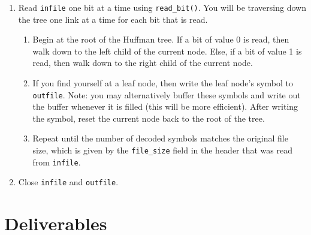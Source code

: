 \documentclass[11pt]{article}
\begin{document}
\begin{enumerate}
  \item Read \texttt{infile} one bit at a time using
    \texttt{read\_bit()}. You will be traversing down the tree one link
    at a time for each bit that is read.

    \begin{enumerate}
      \item Begin at the root of the Huffman tree. If a bit of value 0
        is read, then walk down to the left child of the current node.
        Else, if a bit of value 1 is read, then walk down to the right
        child of the current node.

      \item If you find yourself at a leaf node, then write the leaf
        node's symbol to \texttt{outfile}. Note: you may alternatively
        buffer these symbols and write out the buffer whenever it is
        filled (this will be more efficient). After writing the symbol,
        reset the current node back to the root of the tree.

      \item Repeat until the number of decoded symbols matches the
        original file size, which is given by the \texttt{file\_size}
        field in the header that was read from \texttt{infile}.
    \end{enumerate}

  \item Close \texttt{infile} and \texttt{outfile}.
\end{enumerate}

\section{Deliverables}
\end{document}
